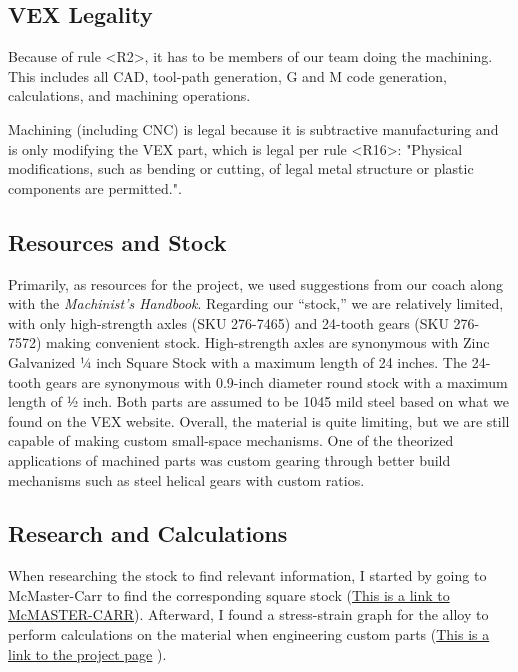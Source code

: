 \subsection*{VEX Legality}
Because of rule \textless R2\textgreater, it has to be members of our team doing the machining. This includes all CAD, tool-path generation, G and M code generation, calculations, and machining operations.

Machining (including CNC) is legal because it is subtractive manufacturing and is only modifying the VEX part, which is legal per rule \textless R16\textgreater: "Physical modifications, such as bending or cutting, of legal metal structure or plastic components are permitted.".

\subsection*{Resources and Stock}
Primarily, as resources for the project, we used suggestions from our coach along with the \textit{Machinist’s Handbook}. Regarding our “stock,” we are relatively limited, with only high-strength axles (SKU 276-7465) and 24-tooth gears (SKU 276-7572) making convenient stock. High-strength axles are synonymous with Zinc Galvanized ¼ inch Square Stock with a maximum length of 24 inches. The 24-tooth gears are synonymous with 0.9-inch diameter round stock with a maximum length of ½ inch. Both parts are assumed to be 1045 mild steel based on what we found on the VEX website. Overall, the material is quite limiting, but we are still capable of making custom small-space mechanisms. One of the theorized applications of machined parts was custom gearing through better build mechanisms such as steel helical gears with custom ratios. 

\subsection*{Research and Calculations}
When researching the stock to find relevant information, I started by going to McMaster-Carr to find the corresponding square stock (\href{https://www.mcmaster.com/8962K33/}{This is a link to McMASTER-CARR}). Afterward, I found a stress-strain graph for the alloy to perform calculations on the material when engineering custom parts (\href{https://www.mdpi.com/2073-4352/13/8/1287}{This is a link to the project page}
\textcite{cryst13081287}).

